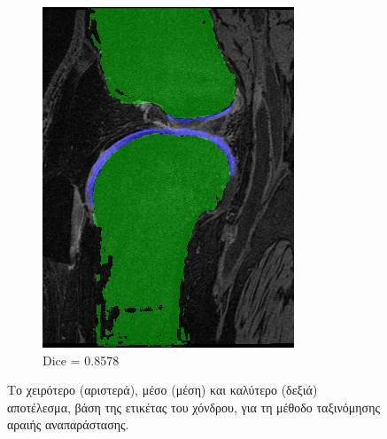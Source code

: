 \documentclass[a4paper,12pt]{article}
\begin{document}
\begin{figure}[H]
\begin{subfigure}[b]{0.32\linewidth}
    \includegraphics[width=\linewidth]{final_SRC_best.png}
    \caption{Dice = 0.8578}
    \end{subfigure}

    \caption{Το χειρότερο (αριστερά), μέσο (μέση) και καλύτερο (δεξιά)
             αποτέλεσμα, βάση της ετικέτας του χόνδρου, για τη μέθοδο
             ταξινόμησης αραιής αναπαράστασης.}
    \label{fig:final_dice_SRC}
\end{figure}
\end{document}
